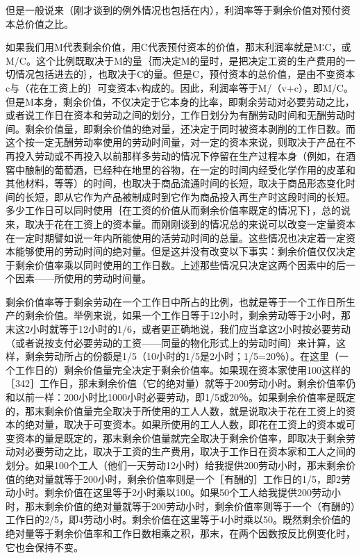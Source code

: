 但是一般说来（刚才谈到的例外情况也包括在内），利润率等于剩余价值对预付资本总价值之比。

如果我们用M代表剩余价值，用C代表预付资本的价值，那末利润率就是M∶C，或M/C。这个比例既取决于M的量｛而决定M的量时，是把决定工资的生产费用的一切情况包括进去的｝，也取决于C的量。但是C，预付资本的总价值，是由不变资本c与（花在工资上的｝可变资本v构成的。因此，利润率等于M/（v+c），即M/C。但是M本身，剩余价值，不仅决定于它本身的比率，即剩余劳动对必要劳动之比，或者说工作日在资本和劳动之间的划分，工作日划分为有酬劳动时间和无酬劳动时间。剩余价值量，即剩余价值的绝对量，还决定于同时被资本剥削的工作日数。而这个按一定无酬劳动率使用的劳动时间量，对一定的资本来说，则取决于产品在不再投入劳动或不再投入以前那样多劳动的情况下停留在生产过程本身（例如，在酒窖中酿制的葡萄酒，已经种在地里的谷物，在一定的时间内经受化学作用的皮革和其他材料，等等）的时间，也取决于商品流通时间的长短，取决于商品形态变化时间的长短，即从它作为产品被制成时到它作为商品投入再生产时这段时间的长短。多少工作日可以同时使用｛在工资的价值从而剩余价值率既定的情况下｝，总的说来，取决于花在工资上的资本量。而刚刚谈到的情况总的来说可以改变一定量资本在一定时期譬如说一年内所能使用的活劳动时间的总量。这些情况也决定着一定资本能够使用的劳动时间的绝对量。但是这并没有改变以下事实：剩余价值仅仅决定于剩余价值率乘以同时使用的工作日数。上述那些情况只决定这两个因素中的后一个因素——所使用的劳动时间量。

剩余价值率等于剩余劳动在一个工作日中所占的比例，也就是等于一个工作日所生产的剩余价值。举例来说，如果一个工作日等于12小时，剩余劳动等于2小时，那末这2小时就等于12小时的1/6，或者更正确地说，我们应当拿这2小时按必要劳动（或者说按支付必要劳动的工资——同量的物化形式上的劳动时间）来计算，这样，剩余劳动所占的份额是1/5（10小时的1/5是2小时；1/5=20％）。在这里（一个工作日的）剩余价值量完全决定于剩余价值率。如果现在资本家使用100这样的［342］工作日，那末剩余价值（它的绝对量）就等于200劳动小时。剩余价值率仍和以前一样：200小时比1000小时必要劳动，即1/5或20％。如果剩余价值率是既定的，那末剩余价值量完全取决于所使用的工人人数，就是说取决于花在工资上的资本的绝对量，取决于可变资本。如果所使用的工人人数，即花在工资上的资本或可变资本的量是既定的，那末剩余价值量就完全取决于剩余价值率，即取决于剩余劳动对必要劳动之比，取决于工资的生产费用，取决于工作日在资本家和工人之间的划分。如果100个工人（他们一天劳动12小时）给我提供200劳动小时，那末剩余价值的绝对量就等于200小时，剩余价值率则是一个［有酬的］工作日的1/5，即2劳动小时。剩余价值在这里等于2小时乘以100。如果50个工人给我提供200劳动小时，那末剩余价值的绝对量就等于200劳动小时，剩余价值率则等于一个（有酬的）工作日的2/5，即4劳动小时。剩余价值在这里等于4小时乘以50。既然剩余价值的绝对量等于剩余价值率和工作日数相乘之积，那末，在两个因数按反比例变化时，它也会保持不变。

